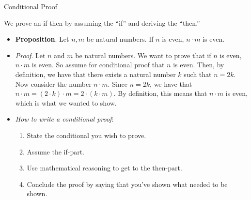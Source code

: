 \documentclass[../slides.tex]{subfiles}
\begin{document}
\begin{frame}{Conditional Proof}

We prove an if-then by assuming the ``if'' and deriving the ``then.''
		
		\begin{itemize}
		
		\item \textbf{Proposition}. Let $n,m$ be natural numbers. If $n$ is even, $n\cdot m$ is even.
			\item \emph{Proof}. Let $n$ and $m$ be natural numbers. We want to prove that if $n$ is even, $n\cdot m$ is even. So assume for conditional proof that $n$ is even. Then, by definition, we have that there exists a natural number $k$ such that $n=2k$. Now consider the number $n\cdot m$. Since $n=2k$, we have that $n \cdot m=(2\cdot k)\cdot m=2\cdot (k\cdot m)$. By definition, this means that $n\cdot m$ is even, which is what we wanted to show.
	
	\item \emph{How to write a conditional proof}:
			
				\begin{enumerate}[1.]
				
					\item State the conditional you wish to prove.					
					\item Assume the if-part. 
					
					\item Use mathematical reasoning to get to the then-part.
					
					\item Conclude the proof by saying that you've shown what needed to be shown.
								
				\end{enumerate}
				
		\end{itemize}

\end{frame}
\end{document}
